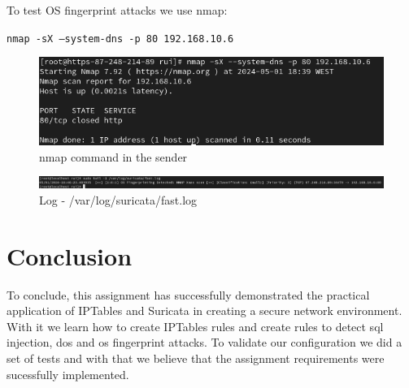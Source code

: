 \documentclass{article}
\begin{document}
To test OS fingerprint attacks we use nmap:\par

\texttt{nmap -sX --system-dns -p 80 192.168.10.6}
\texttt{}\par
\begin{figure}[H]
    \centering
    \includegraphics[scale=0.5]{suricata/os_fingertip_nmap_external.png}
    \caption{nmap command in the sender}
    \label{fig:network-arc}
\end{figure}


\texttt{}\par
\begin{figure}[H]
    \centering
    \includegraphics[scale=0.45]{suricata/os_fingertip_nmap_log.png}
    \caption{Log - /var/log/suricata/fast.log}
    \label{fig:network-arc}
\end{figure}



\section{Conclusion}
\texttt{}\par To conclude, this assignment has successfully demonstrated the practical application of IPTables and Suricata in creating a secure network environment. With it we learn how to create IPTables rules and create rules to detect sql injection, dos and os fingerprint attacks. To validate our configuration we did a set of tests and with that we believe that the assignment requirements were sucessfully implemented.
\end{document}
